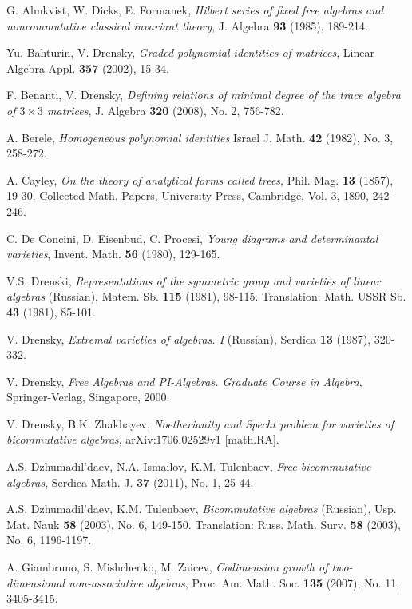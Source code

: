 \documentclass{amsart}[12pt]
\theoremstyle{definition}
\begin{document}
\begin{thebibliography}{99}

G. Almkvist, W. Dicks, E. Formanek,
{\it Hilbert series of fixed free algebras and noncommutative classical invariant theory},
J. Algebra {\bf 93} (1985), 189-214.

Yu. Bahturin, V. Drensky,
{\it Graded polynomial identities of matrices},
Linear Algebra Appl. {\bf 357} (2002), 15-34.

F. Benanti, V. Drensky,
{\it Defining relations of minimal degree of the trace algebra of $3 \times 3$ matrices},
J. Algebra {\bf 320} (2008), No. 2, 756-782.

A. Berele,
{\it Homogeneous polynomial identities}
Israel J. Math.  {\bf 42}  (1982), No. 3, 258-272.

A. Cayley,
{\it On the theory of analytical forms called trees},
Phil. Mag. {\bf 13} (1857), 19-30.
Collected Math. Papers, University Press, Cambridge, Vol. 3, 1890, 242-246.

C. De Concini, D. Eisenbud, C. Procesi,
{\it Young diagrams and determinantal varieties}, Invent. Math.
{\bf 56} (1980), 129-165.

V.S. Drenski,
{\it Representations of the symmetric group and varieties of linear algebras} (Russian),
Matem. Sb. {\bf 115} (1981), 98-115.
Translation: Math. USSR Sb. {\bf 43} (1981), 85-101.

V. Drensky,
{\it Extremal varieties of algebras. I} (Russian),
Serdica {\bf 13} (1987), 320-332.

V. Drensky,
{\it Free Algebras and PI-Algebras. Graduate Course in Algebra},
Springer-Verlag, Singapore, 2000.

V. Drensky, B.K. Zhakhayev,
{\it Noetherianity and Specht problem
for varieties of bicommutative algebras},
arXiv:1706.02529v1 [math.RA].

A.S. Dzhumadil'daev, N.A. Ismailov, K.M. Tulenbaev,
{\it Free bicommutative algebras},
Serdica Math. J. {\bf 37} (2011), No. 1, 25-44.

A.S. Dzhumadil'daev, K.M. Tulenbaev,
{\it Bicommutative algebras} (Russian),
Usp. Mat. Nauk {\bf 58} (2003), No. 6, 149-150.
Translation: Russ. Math. Surv. {\bf 58} (2003), No. 6, 1196-1197.

A. Giambruno, S. Mishchenko, M. Zaicev,
{\it Codimension growth of two-dimensional non-associative algebras},
Proc. Am. Math. Soc. {\bf 135} (2007), No. 11, 3405-3415.


\end{thebibliography}
\end{document}
